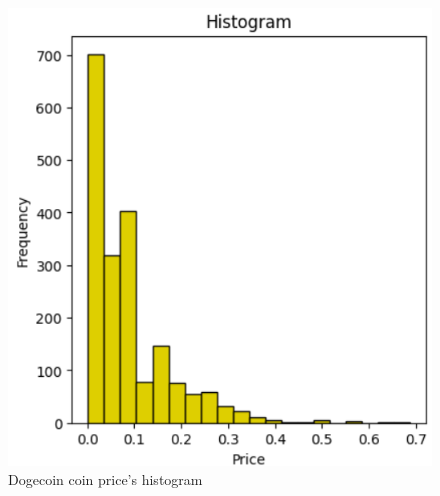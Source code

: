 \documentclass{ieeeojies}
\begin{document}
\begin{figure}[H]
\begin{minipage}{0.23\textwidth}
    \includegraphics[width=1\textwidth]{Image/Discriptive/histo_doge_new.png}
    \caption{Dogecoin coin price's histogram}
    \label{fig:4}
  \end{minipage}
\end{figure}
\end{document}
